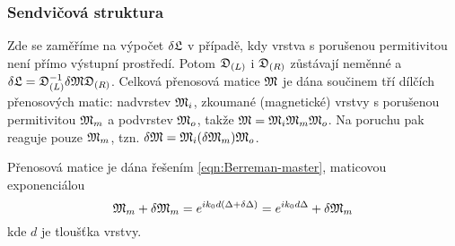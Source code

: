 \subsubsection*{Sendvičová struktura}

Zde se zaměříme na výpočet $\delta\mathfrak{L}$ v případě, kdy vrstva s porušenou permitivitou není přímo výstupní prostředí.
Potom $\mathfrak{D}_{(L)}$ i $\mathfrak{D}_{(R)}$ zůstávají neměnné a $\delta\mathfrak{L} = \mathfrak{D}_{(L)}^{-1}\delta\mathfrak{M}\mathfrak{D}_{(R)}$.
Celková přenosová matice $\mathfrak{M}$ je dána součinem tří dílčích přenosových matic: nadvrstev $\mathfrak{M}_i$, zkoumané (magnetické) vrstvy s porušenou permitivitou $\mathfrak{M}_m$ a podvrstev $\mathfrak{M}_o$, takže $\mathfrak{M} = \mathfrak{M}_i \mathfrak{M}_m \mathfrak{M}_o$.
Na poruchu pak reaguje pouze $\mathfrak{M}_m$, tzn. $\delta\mathfrak{M} = \mathfrak{M}_i (\delta\mathfrak{M}_m) \mathfrak{M}_o$.

Přenosová matice je dána řešením \eqref{eqn:Berreman-master}, maticovou exponenciálou
\begin{equation}
    \mathfrak{M}_m + \delta \mathfrak{M}_m = e^{ik_0d(\Delta+\delta\Delta)} = e^{ik_0d\Delta} + \delta \mathfrak{M}_m
\end{equation}
kde $d$ je tloušťka vrstvy.

